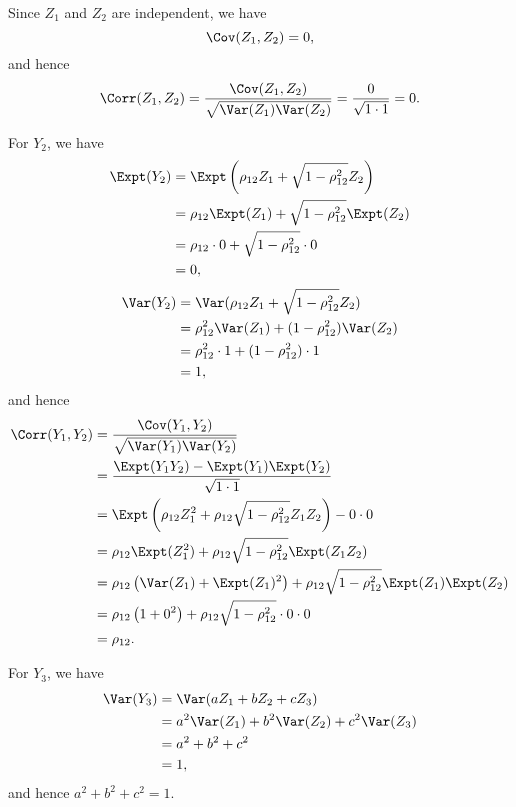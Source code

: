 \Question{\currfilebase}

Since \(Z_1\) and \(Z_2\) are independent, we have
\[
    \Cov(Z_1, Z_2) = 0,
\]
and hence
\[
    \Corr(Z_1, Z_2) = \frac{\Cov(Z_1, Z_2)}{\sqrt{\Var(Z_1) \Var(Z_2)}} = \frac{0}{\sqrt{1 \cdot 1}} = 0.
\]

For \(Y_2\), we have
\begin{align*}
    \Expt(Y_2) & = \Expt\left(\rho_{12} Z_1 + \sqrt{1 - \rho_{12}^2} Z_2\right) \\
               & = \rho_{12} \Expt(Z_1) + \sqrt{1 - \rho_{12}^2} \Expt(Z_2)     \\
               & = \rho_{12} \cdot 0 + \sqrt{1 - \rho_{12}^2} \cdot 0           \\
               & = 0,
\end{align*}
\begin{align*}
    \Var(Y_2) & = \Var(\rho_{12} Z_1 + \sqrt{1 - \rho_{12}^2} Z_2)    \\
              & = \rho_{12}^2 \Var(Z_1) + (1 - \rho_{12}^2) \Var(Z_2) \\
              & = \rho_{12}^2 \cdot 1 + (1 - \rho_{12}^2) \cdot 1     \\
              & = 1,
\end{align*}
and hence
\begin{align*}
    \Corr(Y_1, Y_2) & = \frac{\Cov(Y_1, Y_2)}{\sqrt{\Var(Y_1) \Var(Y_2)}}                                                        \\
                    & = \frac{\Expt(Y_1 Y_2) - \Expt(Y_1) \Expt(Y_2)}{\sqrt{1 \cdot 1}}                                          \\
                    & = \Expt\left(\rho_{12} Z_1^2 + \rho_{12} \sqrt{1 - \rho_{12}^2} Z_1 Z_2\right) - 0 \cdot 0                 \\
                    & = \rho_{12} \Expt(Z_1^2) + \rho_{12} \sqrt{1 - \rho_{12}^2} \Expt(Z_1 Z_2)                                 \\
                    & = \rho_{12} \left(\Var(Z_1) + \Expt(Z_1)^2\right) + \rho_{12} \sqrt{1 - \rho_{12}^2} \Expt(Z_1) \Expt(Z_2) \\
                    & = \rho_{12} \left(1 + 0^2\right) + \rho_{12} \sqrt{1 - \rho_{12}^2} \cdot 0 \cdot 0                        \\
                    & = \rho_{12}.
\end{align*}

For \(Y_3\), we have
\begin{align*}
    \Var(Y_3) & = \Var(a Z_1 + b Z_2 + c Z_3)                   \\
              & = a^2 \Var(Z_1) + b^2 \Var(Z_2) + c^2 \Var(Z_3) \\
              & = a^2 + b^2 + c^2                               \\
              & = 1,
\end{align*}
and hence \(a^2 + b^2 + c^2 = 1\).

